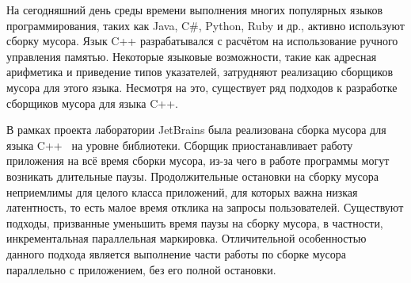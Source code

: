 На сегодняшний день среды времени выполнения многих популярных языков программирования, 
таких как Java, C\#, Python, Ruby и др., активно используют сборку мусора. 
Язык C++ разрабатывался с расчётом на использование ручного управления памятью. 
Некоторые языковые возможности, такие как адресная арифметика и приведение типов указателей, 
затрудняют реализацию сборщиков мусора для этого языка. 
Несмотря на это, существует ряд подходов к разработке сборщиков мусора для языка C++. 

В рамках проекта лаборатории JetBrains была реализована сборка мусора для языка 
C++~\cite{book:precisegc_berezun,book:precisegc_samofalov,book:precisegc_secr} на уровне 
библиотеки. 
Сборщик приостанавливает работу приложения на всё время сборки мусора, из-за чего в работе 
программы могут возникать длительные паузы. 
Продолжительные остановки на сборку мусора неприемлимы для целого класса приложений, 
для которых важна низкая латентность, то есть малое время отклика на запросы пользователей. 
Существуют подходы, призванные уменьшить время паузы на сборку мусора, 
в частности, инкрементальная параллельная маркировка. 
Отличительной особенностью данного подхода является выполнение части работы по 
сборке мусора параллельно с приложением, без его полной остановки.
